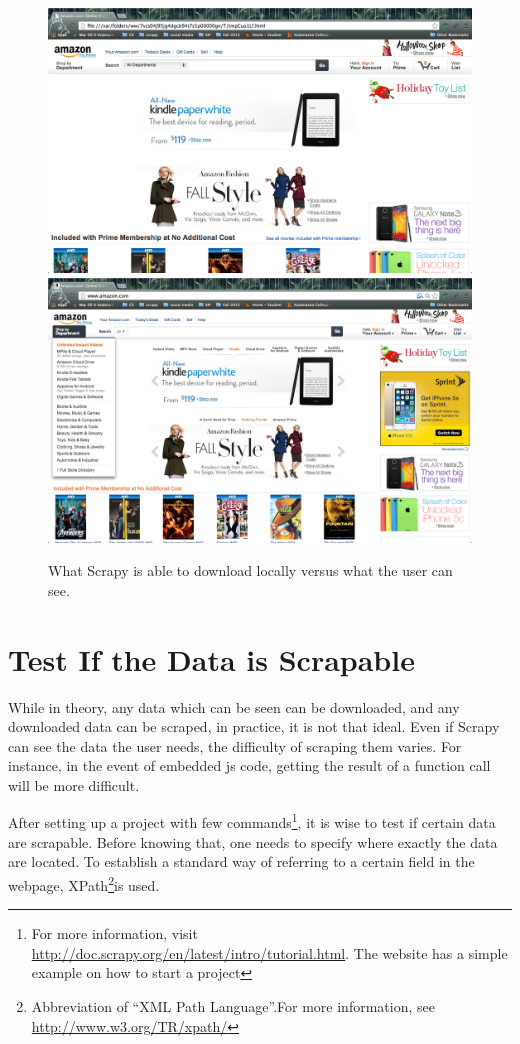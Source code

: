 \documentclass[12pt]{report}
\begin{document}
\begin{figure}[htp]
\includegraphics[width=\textwidth]{amazon_scrapy_view.png}
\includegraphics[width=\textwidth]{amazon_normal_view.png}
\caption[Comparison of views]
{What Scrapy is able to download locally versus what the user can see.}
\end{figure}
\section{Test If the Data is Scrapable}
While in theory, any data which can be seen can be downloaded, and any downloaded data can be scraped, in practice, it is not that ideal. Even if Scrapy can see the data the user needs, the difficulty of scraping them varies. For instance, in the event of embedded \gls{js} code, getting the result of a function call will be more difficult.

After setting up a project with few commands\footnote{For more information, visit \url{http://doc.scrapy.org/en/latest/intro/tutorial.html}. The website has a simple example on how to start a project}, it is wise to test if certain data are scrapable. Before knowing that, one needs to specify where exactly the data are located. To establish a standard way of referring to a certain field in the webpage, XPath\footnote{Abbreviation of ``XML Path Language''.For more information, see \url{http://www.w3.org/TR/xpath/}}is used.
\end{document}

